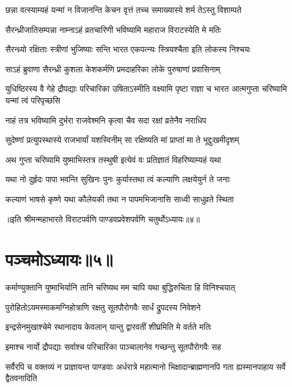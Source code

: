 \twolineshloka
{छन्ना वत्स्याम्यहं यन्मां न विजानन्ति केचन}
{वृत्तं तच्च समाख्यास्ये शर्म तेऽस्तु विशाम्पते}


\twolineshloka
{सैरन्ध्रीजातिसम्पन्ना नाम्नाऽहं व्रतचारिणी}
{भविष्यामि महाराज विराटस्येति मे मतिः}


\twolineshloka
{सैरन्ध्र्यो रक्षिताः स्त्रीणां भुजिष्याः सन्ति भारत}
{एकपत्न्यः स्त्रियश्चैता इति लोकस्य निश्चयः}


\twolineshloka
{साऽहं ब्रुवाणा सैरन्ध्री कुशला केशकर्मणि}
{प्रमदाहरिका लोके पुरुषाणां प्रवासिनाम्}


\threelineshloka
{युधिष्ठिरस्य वै गेहे द्रौपद्याः परिचारिका}
{उषिताऽस्मीति वक्ष्यामि पृष्टा राज्ञा च भारत}
{आत्मगुप्ता चरिष्यामि यन्मां त्वं परिपृच्छसि}


\twolineshloka
{नाहं तत्र भविष्यामि दुर्भरा राजवेश्मनि}
{कृत्वा चैव सदा रक्षां व्रतेनैव नराधिप}


\twolineshloka
{सुदेष्णां प्रत्युपस्थास्ये राजभार्यां यशस्विनीम्}
{सा रक्षिष्यति मां प्राप्तां मा ते भूद्दुःखमीदृशम्}


\twolineshloka
{अथ गुप्ता चरिष्यामि युष्माभिस्तत्र तस्थुषी}
{इत्येवं वः प्रतिज्ञातं विहरिष्याम्यहं यथा}




\twolineshloka
{यथा नो दुर्हृदः पापा भवन्ति सुखिनः पुनः}
{कुर्यास्तथा त्वं कल्याणि लक्षयेयुर्न ते जनाः}


\twolineshloka
{कल्याणं भाषसे कृष्णे यथा कौलेयकी तथा}
{न पापमभिजानासि साध्वी साधुव्रते स्थिता}

॥इति श्रीमन्महाभारते विराटपर्वणि पाण्डवप्रवेशपर्वणि चतुर्थोऽध्यायः॥४॥

\chapter{पञ्चमोऽध्यायः॥५॥}

\twolineshloka
{कर्माण्युक्तानि युष्माभिर्यानि तानि चरिष्यथ}
{मम चापि यथा बुद्धिरुचिता हि विनिश्चयात्}


\twolineshloka
{पुरोहितोऽयमस्माकमग्निहोत्राणि रक्षतु}
{सूतपौरोगवैः सार्धं द्रुपदस्य निवेशने}


\twolineshloka
{इन्द्रसेनमुखाश्चेमे रथानादाय केवलान्}
{यान्तु द्वारवतीं शीघ्रमिति मे वर्तते मतिः}


\twolineshloka
{इमाश्च नार्यो द्रौपद्याः सर्वाश्च परिचारिका}
{पाञ्चालानेव गच्छन्तु सूतपौरोगवैः सह}


\threelineshloka
{सर्वैरपि च वक्तव्यं न प्राज्ञायन्त पाण्डवाः}
{अर्धरात्रे महात्मानो भिक्षादान्ब्राह्मणानपि}
{गता ह्यस्मानपाहाय सर्वे द्वैतवनादिति}


